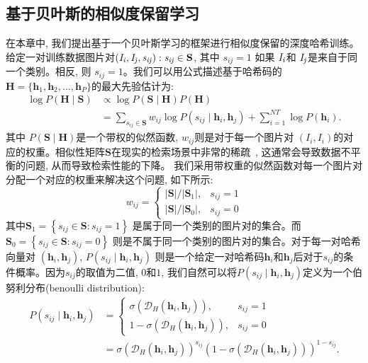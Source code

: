 \subsection{基于贝叶斯的相似度保留学习}
在本章中, 我们提出基于一个贝叶斯学习的框架进行相似度保留的深度哈希训练。给定一对训练数据图片对$(\it{I}_i,\it{I}_j,s_{ij}): s_{ij} \in \textbf{S}$, 其中 $s_{ij} =1 $ 如果 $\it{I}_i$和 $\it{I}_j$是来自于同一个类别。相反, 则 $s_{ij} =1 $。我们可以用公式描述基于哈希码的$\boldsymbol{H} = \{ \mathbf{h}_1, \mathbf{h}_2,...,\mathbf{h}_P\}$的最大先验估计为:
\begin{equation}
    \begin{aligned}
    \log P(\boldsymbol{H} \mid \mathbf{S}) & \propto \log P(\mathbf{S} \mid \boldsymbol{H}) P(\boldsymbol{H}) \\
    &=\sum_{s_{i j} \in \mathbf{S}} w_{i j} \log P\left(s_{i j} \mid \boldsymbol{h}_{i}, \boldsymbol{h}_{j}\right)+\sum_{i=1}^{NT} \log P\left(\boldsymbol{h}_{i}\right).
    \end{aligned}
    \label{eq:map}
\end{equation}
其中 $P(\mathbf{S} \mid \boldsymbol{H})$是一个带权的似然函数, $w_{ij}$则是对于每一个图片对 $(I_i,I_i)$的对应的权重。相似性矩阵$\mathbf{S}$在现实的检索场景中非常的稀疏~\cite{cao2017hashnet}, 这通常会导致数据不平衡的问题, 从而导致检索性能的下降。 我们采用带权重的似然函数对每一个图片对分配一个对应的权重来解决这个问题, 如下所示:
\begin{equation}
    w_{i j}=\left\{\begin{array}{ll}
|\mathbf{S}| /\left|\mathbf{S}_{1}\right|, & s_{i j}=1 \\
|\mathbf{S}| /\left|\mathbf{S}_{0}\right|, & s_{i j}=0
\end{array}\right.
\end{equation}
其中$\mathbf{S}_{1}=\left\{s_{i j} \in \mathbf{S}: s_{i j}=1\right\}$ 是属于同一个类别的图片对的集合。而$\mathbf{S}_{0}=\left\{s_{i j} \in \mathbf{S}: s_{i j}=0\right\}$ 则是不属于同一个类别的图片对的集合。对于每一对哈希向量对 $(\mathbf{h}_i,\mathbf{h}_j)$, $P\left(s_{i j} \mid \boldsymbol{h}_{i}, \boldsymbol{h}_{j}\right)$ 则是一个给定一对哈希码$\mathbf{h}_i$和$\mathbf{h}_j$后对于$s_{ij}$的条件概率。因为$s_{ij}$的取值为二值, $0$和$1$, 我们自然可以将$P\left(s_{i j} \mid \boldsymbol{h}_{i}, \boldsymbol{h}_{j}\right)$定义为一个伯努利分布(benoulli distribution):
\begin{equation}
    \begin{aligned}
P\left(s_{i j} \mid \boldsymbol{h}_{i}, \boldsymbol{h}_{j}\right) &=\left\{\begin{array}{ll}
\sigma\left(\mathcal{D}_H\left(\boldsymbol{h}_{i}, \boldsymbol{h}_{j}\right)\right), & s_{i j}=1 \\
1-\sigma\left(\mathcal{D}_H\left(\boldsymbol{h}_{i}, \boldsymbol{h}_{j}\right)\right), & s_{i j}=0
\end{array}\right.\\
&=\sigma\left(\mathcal{D}_H\left(\boldsymbol{h}_{i}, \boldsymbol{h}_{j}\right)\right)^{s_{i j}}\left(1-\sigma\left(\mathcal{D}_H\left(\boldsymbol{h}_{i}, \boldsymbol{h}_{j}\right)\right)\right)^{1-s_{i j}}.
\end{aligned}
\label{eq:beyesian}
\end{equation}
